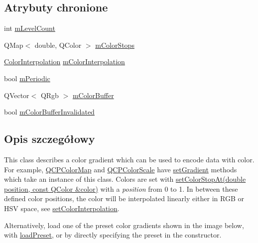 \subsection*{Atrybuty chronione}
\begin{DoxyCompactItemize}
\item 
int \hyperlink{class_q_c_p_color_gradient_a98fb68e359904b2c991fcae3e38a211a}{m\+Level\+Count}
\item 
Q\+Map$<$ double, Q\+Color $>$ \hyperlink{class_q_c_p_color_gradient_a9e11a2b0974ef289d12c324822bc3a3e}{m\+Color\+Stops}
\item 
\hyperlink{class_q_c_p_color_gradient_ac5dca17cc24336e6ca176610e7f77fc1}{Color\+Interpolation} \hyperlink{class_q_c_p_color_gradient_a028cef73d863800a9ee93ffd641cce01}{m\+Color\+Interpolation}
\item 
bool \hyperlink{class_q_c_p_color_gradient_a4b07deeb20ca1ee2d5ea7e01bf0420af}{m\+Periodic}
\item 
Q\+Vector$<$ Q\+Rgb $>$ \hyperlink{class_q_c_p_color_gradient_af8b5f0739faa5f8295154d47ce38ecff}{m\+Color\+Buffer}
\item 
bool \hyperlink{class_q_c_p_color_gradient_abacf55e11f67d6722a687af1bb2687bd}{m\+Color\+Buffer\+Invalidated}
\end{DoxyCompactItemize}


\subsection{Opis szczegółowy}
This class describes a color gradient which can be used to encode data with color. For example, \hyperlink{class_q_c_p_color_map}{Q\+C\+P\+Color\+Map} and \hyperlink{class_q_c_p_color_scale}{Q\+C\+P\+Color\+Scale} have \hyperlink{class_q_c_p_color_map_a7313c78360471cead3576341a2c50377}{set\+Gradient} methods which take an instance of this class. Colors are set with \hyperlink{class_q_c_p_color_gradient_a3b48be5e78079db1bb2a1188a4c3390e}{set\+Color\+Stop\+At(double position, const Q\+Color \&color)} with a {\itshape position} from 0 to 1. In between these defined color positions, the color will be interpolated linearly either in R\+GB or H\+SV space, see \hyperlink{class_q_c_p_color_gradient_aa13fda86406e1d896a465a409ae63b38}{set\+Color\+Interpolation}.

Alternatively, load one of the preset color gradients shown in the image below, with \hyperlink{class_q_c_p_color_gradient_aa0aeec1528241728b9671bf8e60b1622}{load\+Preset}, or by directly specifying the preset in the constructor.


